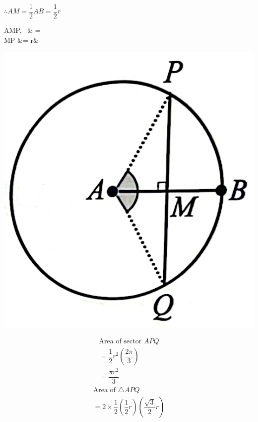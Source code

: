 \documentclass{report}
\begin{document}
\begin{question}
\begin{vwcol}[widths={0.7,0.3},rule=0pt,sep=3em]
		\vspace{1em}
		\noindent$\therefore AM = \dfrac{1}{2}AB = \dfrac{1}{2}r$
		\begin{flalign*}
			\triangle AMP,\ \sin{} & = \\
			MP &= r&
		\end{flalign*}
		\includegraphics[scale=0.16]{assets/8-13.png}
	\end{vwcol}
	\vspace*{-2em}
	\begin{vwcol}[widths={0.2,0.8},rule=0pt,sep=3em]
		\vspace{-2.8em}
		\begin{align*}
			  & \text{Area of sector } APQ                    &   \\
			  & = \dfrac{1}{2}r^2\left(\dfrac{2\pi}{3}\right) &   \\
			&= \dfrac{\pi r^2}{3}
		\end{align*}
		\begin{align*}
			  & \text{Area of } \triangle APQ                                                      &   \\
			  & = 2 \times \dfrac{1}{2}\left(\dfrac{1}{2}r\right)\left(\dfrac{\sqrt{3}}{2}r\right) &   \\

\end{align*}
\end{vwcol}
\end{question}
\end{document}
